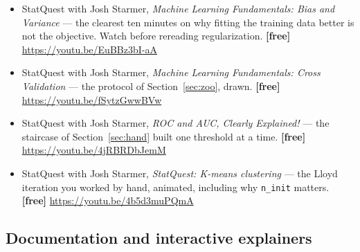 \documentclass[11pt]{article}
\begin{document}
\begin{itemize}[leftmargin=*]
  \item StatQuest with Josh Starmer, \emph{Machine Learning Fundamentals:
    Bias and Variance} --- the clearest ten minutes on why fitting the
    training data better is not the objective. Watch before rereading
    regularization. \textbf{[free]} \url{https://youtu.be/EuBBz3bI-aA}
  \item StatQuest with Josh Starmer, \emph{Machine Learning Fundamentals:
    Cross Validation} --- the protocol of Section~\ref{sec:zoo}, drawn.
    \textbf{[free]} \url{https://youtu.be/fSytzGwwBVw}
  \item StatQuest with Josh Starmer, \emph{ROC and AUC, Clearly Explained!}
    --- the staircase of Section~\ref{sec:hand} built one threshold at a
    time. \textbf{[free]} \url{https://youtu.be/4jRBRDbJemM}
  \item StatQuest with Josh Starmer, \emph{StatQuest: K-means clustering} ---
    the Lloyd iteration you worked by hand, animated, including why
    \texttt{n\_init} matters. \textbf{[free]}
    \url{https://youtu.be/4b5d3muPQmA}
\end{itemize}

\subsection*{Documentation and interactive explainers}
\end{document}
